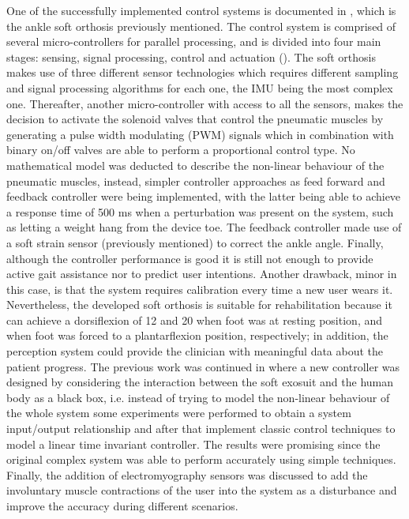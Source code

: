 One of the successfully implemented control systems is documented in \cite{park2011bio}, which is the ankle soft orthosis previously mentioned. The control system is comprised of several micro-controllers for parallel processing, and is divided into four main stages: sensing, signal processing, control and actuation (). The soft orthosis makes use of three different sensor technologies which requires different sampling and signal processing algorithms for each one, the IMU being the most complex one. Thereafter, another micro-controller with access to all the sensors, makes the decision to activate the solenoid valves that control the pneumatic muscles by generating a pulse width modulating (PWM) signals which in combination with binary on/off valves are able to perform a proportional control type. No mathematical model was deducted to describe the non-linear behaviour of the pneumatic muscles, instead, simpler controller approaches as feed forward and feedback controller were being implemented, with the latter being able to achieve a response time of 500 ms when a perturbation was present on the system, such as letting a weight hang from the device toe. The feedback controller made use of a soft strain sensor (previously mentioned) to correct the ankle angle. Finally, although the controller performance is good it is still not enough to provide active gait assistance nor to predict user intentions. Another drawback, minor in this case, is that the system requires calibration every time a new user wears it. Nevertheless, the developed soft orthosis is suitable for rehabilitation because it can achieve a dorsiflexion of 12\textdegree{} and 20\textdegree{} when foot was at resting position, and when foot was forced to a plantarflexion position, respectively; in addition, the perception system could provide the clinician with meaningful data about the patient progress. The previous work was continued in \cite{park2014design} where a new controller was designed by considering the interaction between the soft exosuit and the human body as a black box, i.e. instead of trying to model the non-linear behaviour of the whole system some experiments were performed to obtain a system input/output relationship and after that implement classic control techniques to model a linear time invariant controller. The results were promising since the original complex system was able to perform accurately using simple techniques. Finally, the addition of electromyography sensors was discussed to add the involuntary muscle contractions of the user into the system as a disturbance and improve the accuracy during different scenarios.

